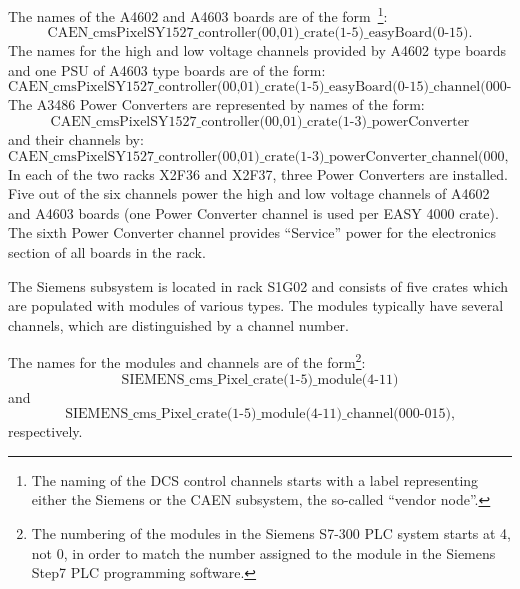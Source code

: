 \documentclass{cmspaper}
\begin{document}
The names of the A4602 and A4603 boards are of the form~\footnote{The naming of the DCS control channels 
starts with a label representing either the Siemens or the CAEN subsystem, the so-called ``vendor node''.}:
\begin{displaymath}
\mbox{CAEN\_cmsPixelSY1527\_controller(00,01)\_crate(1-5)\_easyBoard(0-15).}
\end{displaymath}
The names for the high and low voltage channels provided by A4602 type boards and one PSU of A4603 type boards are of the form:
\begin{displaymath}
\mbox{CAEN\_cmsPixelSY1527\_controller(00,01)\_crate(1-5)\_easyBoard(0-15)\_channel(000-003).}
\end{displaymath}
The A3486 Power Converters are represented by names of the form:
\begin{displaymath}
\mbox{CAEN\_cmsPixelSY1527\_controller(00,01)\_crate(1-3)\_powerConverter}
\end{displaymath}
and their channels by:
\begin{displaymath}
\mbox{CAEN\_cmsPixelSY1527\_controller(00,01)\_crate(1-3)\_powerConverter\_channel(000, 001).}
\end{displaymath}
In each of the two racks X2F36 and X2F37, three Power Converters are installed.
Five out of the six channels power the high and low voltage channels of A4602 and A4603 boards
(one Power Converter channel is used per EASY 4000 crate).
The sixth Power Converter channel provides ``Service'' power for the electronics section of all boards in the rack.

The Siemens subsystem is located in rack S1G02 and consists of five crates
which are populated with modules of various types. 
The modules typically have several channels,
which are distinguished by a channel number. 

The names for the modules and channels are of the form\footnote{The numbering of the modules in the Siemens S7-300 PLC system starts at 4, not 0, 
in order to match the number assigned to the module in the Siemens Step7 PLC programming software.}:
\begin{displaymath}
\mbox{SIEMENS\_cms\_Pixel\_crate(1-5)\_module(4-11)}
\end{displaymath}
and 
\begin{displaymath}
\mbox{SIEMENS\_cms\_Pixel\_crate(1-5)\_module(4-11)\_channel(000-015),}
\end{displaymath}
respectively.
\end{document}
